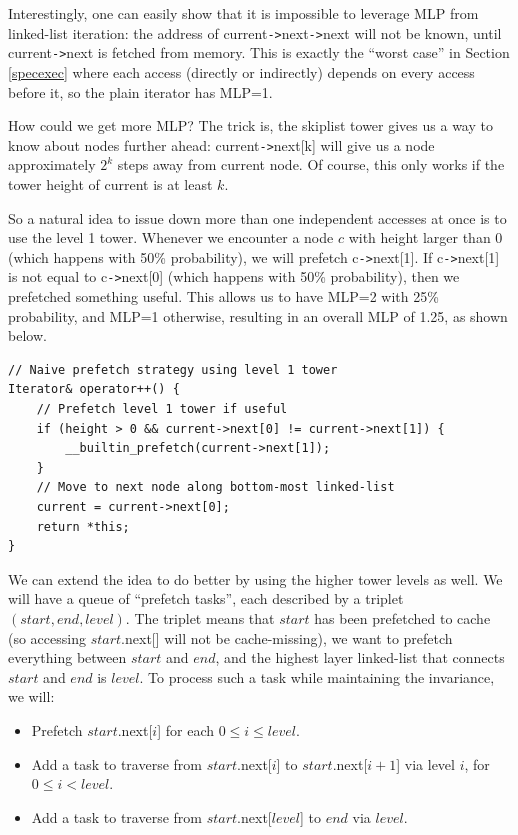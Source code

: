 \documentclass[11pt, usletter]{article}
\begin{document}
Interestingly, one can easily show that it is impossible to leverage MLP 
from linked-list iteration: the address of current\verb|->|next\verb|->|next will not be known, 
until current\verb|->|next is fetched from memory. 
This is exactly the ``worst case'' in Section \ref{specexec} where each access (directly or indirectly) depends on every access before it, 
so the plain iterator has MLP=1.

How could we get more MLP? 
The trick is, the skiplist tower gives us a way to know about nodes further ahead: 
current\verb|->|next[k] will give us a node approximately $2^k$ steps away from current node.
Of course, this only works if the tower height of current is at least $k$.

So a natural idea to issue down more than one independent accesses at once is to use the level 1 tower. 
Whenever we encounter a node $c$ with height larger than 0 (which happens with 50\% probability), we will prefetch c\verb|->|next[1]. 
If c\verb|->|next[1] is not equal to c\verb|->|next[0] (which happens with 50\% probability), 
then we prefetched something useful. This allows us to have MLP=2 with 25\% probability, and MLP=1 otherwise, 
resulting in an overall MLP of 1.25, as shown below.

\singlespacing\begin{codebox}
\begin{verbatim}
// Naive prefetch strategy using level 1 tower
Iterator& operator++() { 
    // Prefetch level 1 tower if useful
    if (height > 0 && current->next[0] != current->next[1]) {
        __builtin_prefetch(current->next[1]);
    }
    // Move to next node along bottom-most linked-list 
    current = current->next[0]; 
    return *this;
}
\end{verbatim}
\end{codebox}\doublespacing

We can extend the idea to do better by using the higher tower levels as well. 
We will have a queue of ``prefetch tasks'', each described by a triplet $(start,end,level)$. 
The triplet means that $start$ has been prefetched to cache (so accessing $start$.next[] will not be cache-missing), 
we want to prefetch everything between $start$ and $end$,
and the highest layer linked-list that connects $start$ and $end$ is $level$. 
To process such a task while maintaining the invariance, we will: 
\begin{itemize}
[topsep=0pt,partopsep=0pt,itemsep=0pt,parsep=0pt,fullwidth,itemindent=\parindent,listparindent=\parindent]
\item Prefetch $start$.next[$i$] for each $0\leq i\leq level$.
\item Add a task to traverse from $start$.next[$i$] to $start$.next[$i+1$] via level $i$, for $0\leq i<level$.
\item Add a task to traverse from $start$.next[$level$] to $end$ via $level$.
\end{itemize}
\end{document}
